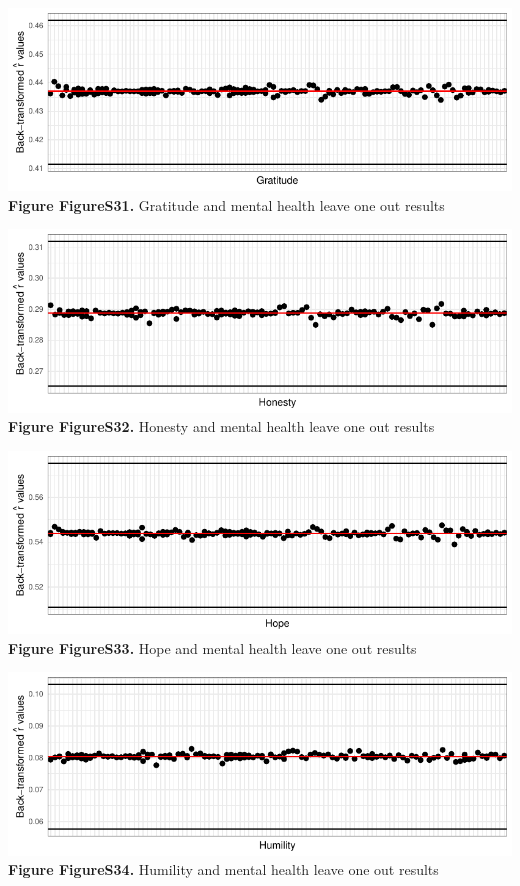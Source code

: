 \documentclass[
  letterpaper,
  DIV=11,
  numbers=noendperiod]{scrartcl}
\begin{document}
\includegraphics{SupplementaryResults_files/figure-pdf/unnamed-chunk-12-7.pdf}\textbf{Figure
FigureS31.} Gratitude and mental health leave one out results

\includegraphics{SupplementaryResults_files/figure-pdf/unnamed-chunk-12-8.pdf}\textbf{Figure
FigureS32.} Honesty and mental health leave one out results

\includegraphics{SupplementaryResults_files/figure-pdf/unnamed-chunk-12-9.pdf}\textbf{Figure
FigureS33.} Hope and mental health leave one out results

\includegraphics{SupplementaryResults_files/figure-pdf/unnamed-chunk-12-10.pdf}\textbf{Figure
FigureS34.} Humility and mental health leave one out results
\end{document}
